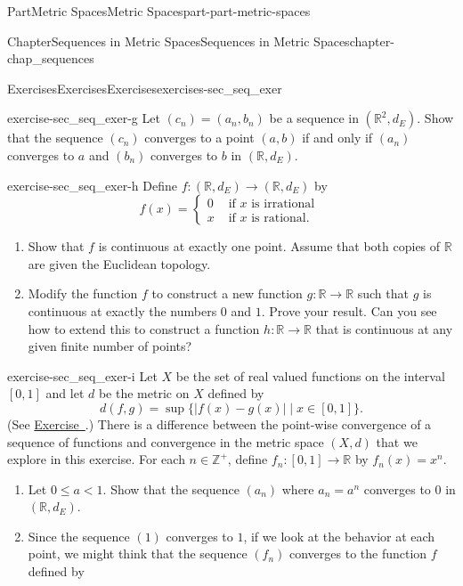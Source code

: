 \documentclass[oneside,10pt,]{book}
\newcommand{\xreffont}{\relax}
\numberwithin{equation}{chapter}
\newcommand{\Z}{\mathbb{Z}}
\newcommand{\R}{\mathbb{R}}
\newcommand{\lt}{<}
\newcommand{\amp}{&}
\begin{document}
\begin{partptx}{Part}{Metric Spaces}{}{Metric Spaces}{}{}{part-part-metric-spaces}
\begin{chapterptx}{Chapter}{Sequences in Metric Spaces}{}{Sequences in Metric Spaces}{}{}{chapter-chap_sequences}
\begin{exercises-section}{Exercises}{Exercises}{}{Exercises}{}{}{exercises-sec_seq_exer}
\begin{divisionexercise}{7}{}{}{exercise-sec_seq_exer-g}
Let \((c_n) = (a_n,b_n)\) be a sequence in \((\R^2, d_E)\). Show that the sequence \((c_n)\) converges to a point \((a,b)\) if and only if \((a_n)\) converges to \(a\) and \((b_n)\) converges to \(b\) in \((\R, d_E)\).%
\end{divisionexercise}%
\begin{divisionexercise}{8}{}{}{exercise-sec_seq_exer-h}%
Define \(f : (\R,d_E) \to (\R,d_E)\) by%
\begin{equation*}
f(x) = \begin{cases}0 \amp \text{ if }  x \text{ is irrational }  \\ x \amp \text{ if }  x \text{ is rational. } \end{cases}
\end{equation*}
%
\begin{enumerate}[font=\bfseries,label=(\alph*),ref=\alph*]%
\item{}Show that \(f\) is continuous at exactly one point. Assume that both copies of \(\R\) are given the Euclidean topology.%
\item{}Modify the function \(f\) to construct a new function \(g: \R \to \R\) such that \(g\) is continuous at exactly the numbers \(0\) and \(1\). Prove your result. Can you see how to extend this to construct a function \(h: \R \to \R\) that is continuous at any given finite number of points?%
\end{enumerate}%
\end{divisionexercise}%
\begin{divisionexercise}{9}{}{}{exercise-sec_seq_exer-i}%
Let \(X\) be the set of real valued functions on the interval \([0,1]\) and let \(d\) be the metric on \(X\) defined by%
\begin{equation*}
d(f,g) = \sup\{|f(x)-g(x)| \mid x \in [0,1]\}\text{.}
\end{equation*}
(See \hyperlink{exercise-ex_GLB_function_sup_metric}{Exercise~{\xreffont 4}}.)  There is a difference between the point-wise convergence of a sequence of functions and convergence in the metric space \((X,d)\) that we explore in this exercise. For each \(n \in \Z^+\), define \(f_n :[0,1] \to \R\) by \(f_n(x) = x^n\).%
\begin{enumerate}[font=\bfseries,label=(\alph*),ref=\alph*]%
\item{}Let \(0 \leq a \lt 1\). Show that the sequence \((a_n)\) where \(a_n = a^n\) converges to \(0\) in \((\R, d_E)\).%
\item{}Since the sequence \((1)\) converges to \(1\), if we look at the behavior at each point, we might think that the sequence \((f_n)\) converges to the function \(f\) defined by%

\end{enumerate}
\end{divisionexercise}
\end{exercises-section}
\end{chapterptx}
\end{partptx}
\end{document}
